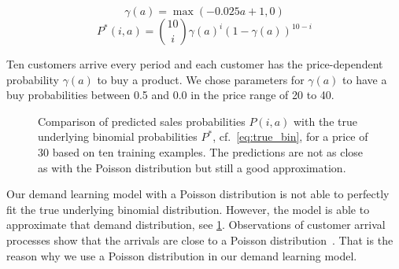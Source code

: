 \begin{equation}
\gamma(a) = \max(-0.025 a + 1, 0)
\end{equation}
\begin{equation}
P^*(i, a) = \binom{10}{i} \gamma(a)^i (1 - \gamma(a))^{10-i}
\label{eq:true_bin}
\end{equation}

Ten customers arrive every period and each customer has the price-dependent probability $\gamma(a)$ to buy a product.
We chose parameters for $\gamma(a)$ to have a buy probabilities between 0.5 and 0.0 in the price range of 20 to 40.

\begin{figure}[t]
	\caption[Comparison of Predicted Probabilites with Underlying Binomial Probabilities]{Comparison of predicted sales probabilities $P(i,a)$ with the true underlying binomial probabilities $P^*$, cf.~\cref{eq:true_bin}, for a price of 30 based on ten training examples. The predictions are not as close as with the Poisson distribution but still a good approximation.}
	\label{fig:probs_binom}
\end{figure}

Our demand learning model with a Poisson distribution is not able to perfectly fit the true underlying binomial distribution.
However, the model is able to approximate that demand distribution, see \cref{fig:probs_binom}.
Observations of customer arrival processes show that the arrivals are close to a Poisson distribution~\cite{DBLP:journals/ior/Wolff82}.
That is the reason why we use a Poisson distribution in our demand learning model.

